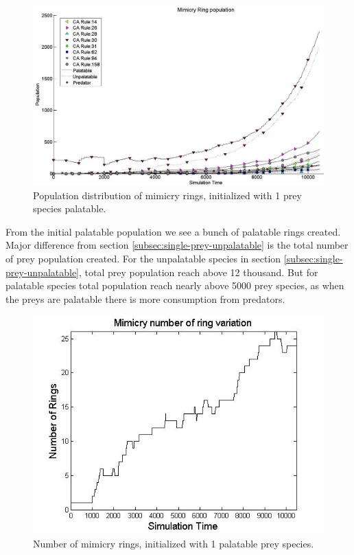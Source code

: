 \documentclass[letterpaper]{article}
\numberwithin{equation}{section}
\begin{document}
\begin{figure}[H]
	\centering
	\includegraphics[scale=0.45]{../tex/images/simTime10k-1Prey-p}
	\caption[Population distribution of mimicry rings (1 prey species palatable)]{Population distribution of mimicry rings, initialized with 1 prey species palatable.}
	\label{fig:plot-1-prey-p}
\end{figure}

From the initial palatable population we see a bunch of palatable rings created. Major difference from section \ref{subsec:single-prey-unpalatable} is the total number of prey population created. For the unpalatable species in section \ref{subsec:single-prey-unpalatable}, total prey population reach above 12 thousand. But for palatable species total population reach nearly above 5000 prey species, as when the preys are palatable there is more consumption from predators. 

\begin{figure}[H]
	\centering
	\includegraphics[scale=0.50]{../tex/images/ringSize10k-1Prey-p}
	\caption[Number of mimicry rings (1 palatable prey species)]{Number of mimicry rings, initialized with 1 palatable prey species.}
	\label{fig:ringSize8k-1-Prey-p}
\end{figure}
\end{document}
